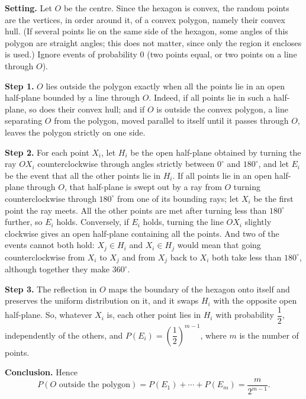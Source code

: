 \textbf{Setting.} Let $O$ be the centre. Since the hexagon is convex, the random points are the vertices, in order around it, of a convex polygon, namely their convex hull. (If several points lie on the same side of the hexagon, some angles of this polygon are straight angles; this does not matter, since only the region it encloses is used.) Ignore events of probability $0$ (two points equal, or two points on a line through $O$).

\textbf{Step 1.} $O$ lies outside the polygon exactly when all the points lie in an open half-plane bounded by a line through $O$. Indeed, if all points lie in such a half-plane, so does their convex hull; and if $O$ is outside the convex polygon, a line separating $O$ from the polygon, moved parallel to itself until it passes through $O$, leaves the polygon strictly on one side.

\textbf{Step 2.} For each point $X_i$, let $H_i$ be the open half-plane obtained by turning the ray $OX_i$ counterclockwise through angles strictly between $0^\circ$ and $180^\circ$, and let $E_i$ be the event that all the other points lie in $H_i$. If all points lie in an open half-plane through $O$, that half-plane is swept out by a ray from $O$ turning counterclockwise through $180^\circ$ from one of its bounding rays; let $X_i$ be the first point the ray meets. All the other points are met after turning less than $180^\circ$ further, so $E_i$ holds. Conversely, if $E_i$ holds, turning the line $OX_i$ slightly clockwise gives an open half-plane containing all the points. And two of the events cannot both hold: $X_j\in H_i$ and $X_i\in H_j$ would mean that going counterclockwise from $X_i$ to $X_j$ and from $X_j$ back to $X_i$ both take less than $180^\circ$, although together they make $360^\circ$.

\textbf{Step 3.} The reflection in $O$ maps the boundary of the hexagon onto itself and preserves the uniform distribution on it, and it swaps $H_i$ with the opposite open half-plane. So, whatever $X_i$ is, each other point lies in $H_i$ with probability $\dfrac12$, independently of the others, and $P(E_i)=\left(\dfrac12\right)^{m-1}$, where $m$ is the number of points.

\textbf{Conclusion.} Hence
\[P(O\text{ outside the polygon})=P(E_1)+\cdots+P(E_m)=\dfrac{m}{2^{m-1}}.\]

